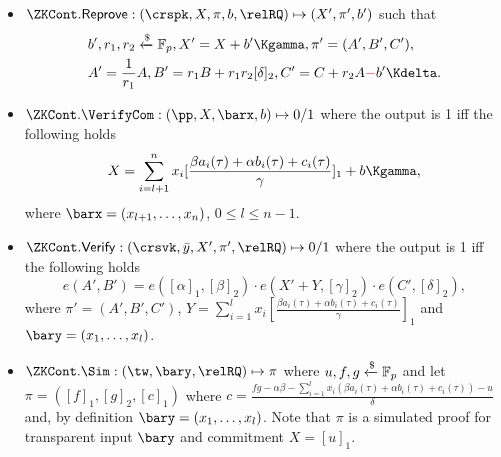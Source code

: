 \begin{definition}
\begin{itemize}
\item $\ZKCont.\Reprove: (\crspk, X, \pi, b, \relRQ) \mapsto (X', \pi', b')$  such that
\begin{align*}
&b ', r_1, r_2  \xleftarrow{\$} \F_p, X' = X + b' \Kgamma, \pi' = (A', B', C'), \\
&A' = \frac{1}{r_1} A, B' = r_1 B + r_1r_2[\delta]_2, C' = C + r_2A  {\color{red} -} b'\Kdelta \mathperiod
\end{align*}
 
\item $\ZKCont.\VerifyCom: (\pp, X, \barx, b) \mapsto 0/1$ where the output is 1 iff the following holds
$$X = \sum_{i=l+1}^{n} x_i [\frac{\beta a_i(\tau)+ \alpha b_i(\tau)+ c_i(\tau)}{\gamma}]_1  + b \Kgamma,$$
where $\barx = (x_{l+1}, \ldots, x_n)$, $ 0 \leq l \leq n-1$. 
\item $\ZKCont.\Verify: (\crsvk, \bar{y}, X', \pi', \relRQ) \mapsto 0/1$ where the output is 1 iff the following holds 
$$e(A',B') = e([\alpha]_1, [\beta]_2) \cdot e(X' + Y, [\gamma]_2) \cdot e(C', [\delta]_2),$$
where $\pi' = (A', B', C')$, $Y = \sum_{i=1}^{l} x_i [\frac{\beta a_i(\tau)+ \alpha b_i(\tau)+ c_i(\tau)}{\gamma}]_1$ 
and $\bary = (x_1, \ldots, x_l)$.

\item $\ZKCont.\Sim: (\tw, \bary, \relRQ) \mapsto \pi$ where $u, f, g \xleftarrow {\$} \mathbb{F}_p$ and let \\
$\pi = ([f]_1, [g]_2, [c]_1)$ where $c = \frac{fg - \alpha \beta - \sum_{i=1}^{l} x_i (\beta a_i(\tau)+ \alpha b_i(\tau)+ c_i(\tau))- u}{\delta}  $ and, 
by definition $\bary = (x_1, \ldots, x_l)$. Note that $\pi$ is a simulated proof for transparent input $\bary$ and commitment $X = [u]_1$.
\end{itemize} 
\end{definition}

